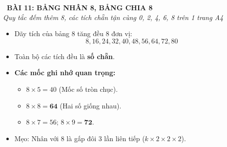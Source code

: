 \documentclass[12pt,a4paper]{article}
\begin{document}
\begin{tcolorbox}[
  enhanced,
  colback=teal!8!white,
  colframe=teal!70!black,
  arc=3mm, boxrule=1.2pt,
  left=3mm, right=3mm, top=2mm, bottom=2mm,
  halign=center
]
  {\LARGE\bfseries\color{teal!90!black}\faBookmark\ BÀI 11: BẢNG NHÂN 8, BẢNG CHIA 8}\\[1mm]
  {\itshape\footnotesize\color{black!75} Quy tắc đếm thêm 8, các tích chẵn tận cùng 0, 2, 4, 6, 8 trên 1 trang A4}
\end{tcolorbox}

\vspace{-2mm}

\noindent
\begin{minipage}[t]{0.49\textwidth}\vspace{0pt}
\begin{tcolorbox}[
  enhanced,
  colback=blue!4!white,
  colframe=blue!75!black,
  arc=2mm, boxrule=0.8pt,
  left=2mm, right=2mm, top=1.8mm, bottom=1.8mm,
  title={\footnotesize\bfseries\color{white}\faTimes\ 1. Bảng nhân 8 (Đếm thêm 8)}
]
{\footnotesize
\begin{itemize}\setlength{\itemsep}{0.6pt}\setlength{\leftskip}{-2.5mm}
  \item Dãy tích của bảng 8 tăng đều 8 đơn vị:
  $$8, 16, 24, 32, 40, 48, 56, 64, 72, 80$$
  \item Toàn bộ các tích đều là \textbf{số chẵn}.
  \item \textbf{Các mốc ghi nhớ quan trọng:}
  \begin{itemize}\setlength{\itemsep}{0.5pt}\setlength{\leftskip}{-2.5mm}
    \item $8 \times 5 = 40$ (Mốc số tròn chục).
    \item $8 \times 8 = \mathbf{64}$ (Hai số giống nhau).
    \item $8 \times 7 = 56$; $8 \times 9 = \mathbf{72}$.
  \end{itemize}
  \item Mẹo: Nhân với 8 là gấp đôi 3 lần liên tiếp ($k \times 2 \times 2 \times 2$).
\end{itemize}
}
\end{tcolorbox}
\end{minipage}
\hfill
\end{document}
